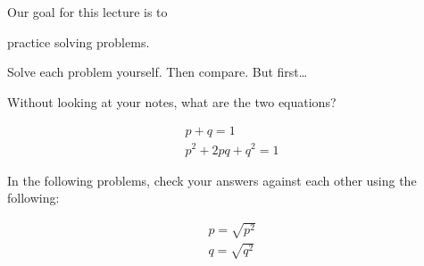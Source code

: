 \documentclass[t]{beamer}
\begin{document}
\begin{frame}{Our goal for this lecture is to}
	
	\hangpara practice solving  problems.

	\hangpara Solve each problem yourself. Then compare. But first\dots
	
\end{frame}
%

\begin{frame}{Without looking at your notes, what are the two equations?}

	\pause \vspace{-2\baselineskip}

	{\centering
	\large
	\begin{align*}
		p + q = 1 \\
		p^2 + 2pq + q^2 = 1
	\end{align*}	
	}
	
	\pause 
	\hangpara In the following problems, check your answers against each other using the following:
	
	\vspace{-\baselineskip}
	{\centering
	\large
	\begin{align*}
		p = \sqrt{p^2} \\
		q = \sqrt{q^2}
	\end{align*}	
	}
	
\end{frame}
%
\end{document}
